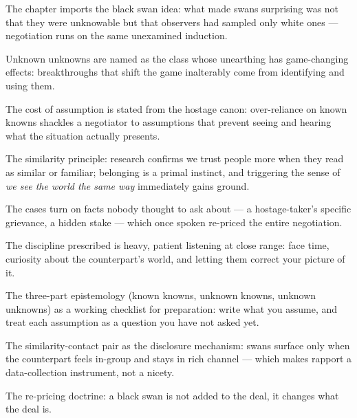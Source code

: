 

\begin{distilled}
  \item The chapter imports the black swan idea: what made swans surprising was not that they were unknowable but that observers had sampled only white ones --- negotiation runs on the same unexamined induction.
  \item Unknown unknowns are named as the class whose unearthing has game-changing effects: breakthroughs that shift the game inalterably come from identifying and using them.
  \item The cost of assumption is stated from the hostage canon: over-reliance on known knowns shackles a negotiator to assumptions that prevent seeing and hearing what the situation actually presents.
  \item The similarity principle: research confirms we trust people more when they read as similar or familiar; belonging is a primal instinct, and triggering the sense of \emph{we see the world the same way} immediately gains ground.
  \item The cases turn on facts nobody thought to ask about --- a hostage-taker's specific grievance, a hidden stake --- which once spoken re-priced the entire negotiation.
  \item The discipline prescribed is heavy, patient listening at close range: face time, curiosity about the counterpart's world, and letting them correct your picture of it.
\end{distilled}

\begin{unique}
  \item The three-part epistemology (known knowns, unknown knowns, unknown unknowns) as a working checklist for preparation: write what you assume, and treat each assumption as a question you have not asked yet.
  \item The similarity-contact pair as the disclosure mechanism: swans surface only when the counterpart feels in-group and stays in rich channel --- which makes rapport a data-collection instrument, not a nicety.
  \item The re-pricing doctrine: a black swan is not added to the deal, it changes what the deal is.
\end{unique}
